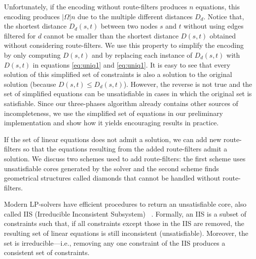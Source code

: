 Unfortunately, if the encoding without route-filters produces $n$ equations, this encoding produces $|\Omega|n$ due
to the multiple different distances $D_d$.
Notice that, the shortest distance $D_d(s,t)$ between two nodes $s$ and $t$ without using edges filtered for $d$ cannot be
smaller than the shortest distance $D(s,t)$ obtained without considering route-filters.
We use this property to simplify the encoding by only computing $D(s,t)$ and by replacing each instance of $D_d(s,t)$
with $D(s,t)$ in
equations \eqref{eq:uniq1} and \eqref{eq:uniq1}. 
It is easy to see that every solution of this simplified set of constraints
is also a solution to the original solution (because $D(s,t)\leq D_d(s,t)$).
However, the reverse is not true and the set of simplified equations can be unsatisfiable
in cases in which the original set is satisfiable.
Since our three-phases algorithm already contains other sources of incompleteness, we use the simplified
set of equations in our preliminary implementation and show how it yields encouraging results in practice.

If the set of linear equations does not admit a solution, we 
can add new route-filters so that the equations resulting from the added
route-filters admit a solution.
We discuss two schemes used to add route-filters:
the first scheme uses unsatisfiable cores generated
by the solver and the second scheme 
finds geometrical structures called diamonds that 
cannot be handled without route-filters.



Modern LP-solvers have efficient procedures to return an
unsatisfiable core, also called IIS (Irreducible Inconsistent Subsystem)
~\cite{chinneck2007feasibility}. Formally, an IIS is a subset of constraints such that,
if all constraints except those in the IIS are removed, the resulting set of
linear equations is still inconsistent (unsatisfiable). Moreover, the set is irreducible---i.e., removing 
any one constraint of the IIS produces a consistent set of constraints. 

